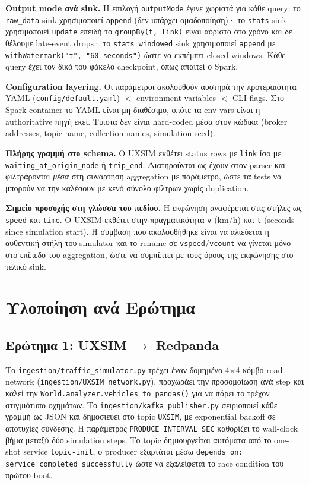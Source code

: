 \documentclass[11pt,a4paper]{article}
\newcommand{\code}[1]{\texttt{\small #1}}
\begin{document}
\textbf{Output mode ανά sink.} Η επιλογή \code{outputMode} έγινε χωριστά για κάθε query: το \code{raw\_data} sink χρησιμοποιεί \code{append} (δεν υπάρχει ομαδοποίηση)· το \code{stats} sink χρησιμοποιεί \code{update} επειδή το \code{groupBy(t, link)} είναι αόριστο στο χρόνο και δε θέλουμε late-event drops· το \code{stats\_windowed} sink χρησιμοποιεί \code{append} με \code{withWatermark("t", "60 seconds")} ώστε να εκπέμπει closed windows. Κάθε query έχει τον δικό του φάκελο checkpoint, όπως απαιτεί ο Spark.

\textbf{Configuration layering.} Οι παράμετροι ακολουθούν αυστηρά την προτεραιότητα YAML (\code{config/default.yaml}) $<$ environment variables $<$ CLI flags. Στο Spark container το YAML είναι μη διαθέσιμο, οπότε τα env vars είναι η authoritative πηγή εκεί. Τίποτα δεν είναι hard-coded μέσα στον κώδικα (broker addresses, topic name, collection names, simulation seed).

\textbf{Πλήρης γραμμή στο schema.} Ο UXSIM εκθέτει status rows με \code{link} ίσο με \code{waiting\_at\_origin\_node} ή \code{trip\_end}. Διατηρούνται ως έχουν στον parser και φιλτράρονται \emph{μέσα} στη συνάρτηση aggregation με παράμετρο, ώστε τα tests να μπορούν να την καλέσουν με κενό σύνολο φίλτρων χωρίς duplication.

\textbf{Σημείο προσοχής στη γλώσσα του πεδίου.} Η εκφώνηση αναφέρεται στις στήλες ως \code{speed} και \code{time}. Ο UXSIM εκθέτει στην πραγματικότητα \code{v} (km/h) και \code{t} (seconds since simulation start). Η σύμβαση που ακολουθήθηκε είναι να αλιεύεται η αυθεντική στήλη του simulator και το rename σε \code{vspeed}/\code{vcount} να γίνεται μόνο στο επίπεδο του aggregation, ώστε να συμπίπτει με τους όρους της εκφώνησης στο τελικό sink.

\section{Υλοποίηση ανά Ερώτημα}

\subsection{Ερώτημα 1: UXSIM $\rightarrow$ Redpanda}
Το \code{ingestion/traffic\_simulator.py} τρέχει έναν δομημένο 4$\times$4 κόμβο road network (\code{ingestion/UXSIM\_network.py}), προχωράει την προσομοίωση ανά step και καλεί την \code{World.analyzer.vehicles\_to\_pandas()} για να πάρει το τρέχον στιγμιότυπο οχημάτων. Το \code{ingestion/kafka\_publisher.py} σειριοποιεί κάθε γραμμή ως JSON και δημοσιεύει στο topic \code{UXSIM}, με exponential backoff σε αποτυχίες σύνδεσης. Η παράμετρος \code{PRODUCE\_INTERVAL\_SEC} καθορίζει το wall-clock βήμα μεταξύ δύο simulation steps. Το topic δημιουργείται αυτόματα από το one-shot service \code{topic-init}, ο producer εξαρτάται μέσω \code{depends\_on: service\_completed\_successfully} ώστε να εξαλείφεται το race condition του πρώτου boot.
\end{document}
